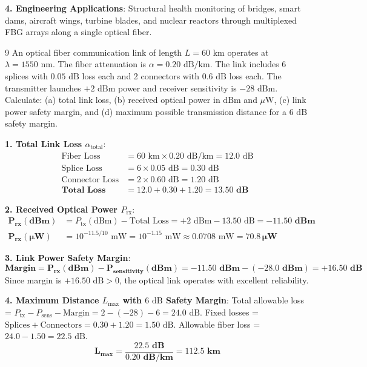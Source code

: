 \begin{theorysol}
\textbf{4. Engineering Applications}:
Structural health monitoring of bridges, smart dams, aircraft wings, turbine blades, and nuclear reactors through multiplexed FBG arrays along a single optical fiber.
\end{theorysol}
\vspace{4mm}

\begin{theoryq}{9}
An optical fiber communication link of length $L = 60\text{ km}$ operates at $\lambda = 1550\text{ nm}$. The fiber attenuation is $\alpha = 0.20\text{ dB/km}$. The link includes 6 splices with $0.05\text{ dB}$ loss each and 2 connectors with $0.6\text{ dB}$ loss each. The transmitter launches $+2\text{ dBm}$ power and receiver sensitivity is $-28\text{ dBm}$. Calculate: (a) total link loss, (b) received optical power in $\text{dBm}$ and $\mu\text{W}$, (c) link power safety margin, and (d) maximum possible transmission distance for a $6\text{ dB}$ safety margin.
\end{theoryq}
\begin{theorysol}
\textbf{1. Total Link Loss $\alpha_{\text{total}}$}:
\begin{align*}
\text{Fiber Loss} &= 60\text{ km} \times 0.20\text{ dB/km} = 12.0\text{ dB} \\
\text{Splice Loss} &= 6 \times 0.05\text{ dB} = 0.30\text{ dB} \\
\text{Connector Loss} &= 2 \times 0.60\text{ dB} = 1.20\text{ dB} \\
\mathbf{\text{Total Loss}} &= 12.0 + 0.30 + 1.20 = \mathbf{13.50\text{ dB}}
\end{align*}

\textbf{2. Received Optical Power $P_{\text{rx}}$}:
\begin{align*}
\mathbf{P_{\text{rx}}(\text{dBm})} &= P_{\text{tx}}(\text{dBm}) - \text{Total Loss} = +2\text{ dBm} - 13.50\text{ dB} = \mathbf{-11.50\text{ dBm}} \\
\mathbf{P_{\text{rx}}(\mu\text{W})} &= 10^{-11.5/10}\text{ mW} = 10^{-1.15}\text{ mW} \approx 0.0708\text{ mW} = \mathbf{70.8\,\mu\text{W}}
\end{align*}

\textbf{3. Link Power Safety Margin}:
\begin{equation}
\mathbf{\text{Margin} = P_{\text{rx}}(\text{dBm}) - P_{\text{sensitivity}}(\text{dBm}) = -11.50\text{ dBm} - (-28.0\text{ dBm}) = +16.50\text{ dB}}
\end{equation}
Since margin is $+16.50\text{ dB} > 0$, the optical link operates with excellent reliability.

\textbf{4. Maximum Distance $L_{\text{max}}$ with $6\text{ dB}$ Safety Margin}:
Total allowable loss = $P_{\text{tx}} - P_{\text{sens}} - \text{Margin} = 2 - (-28) - 6 = 24.0\text{ dB}$.
Fixed losses = $\text{Splices} + \text{Connectors} = 0.30 + 1.20 = 1.50\text{ dB}$.
Allowable fiber loss = $24.0 - 1.50 = 22.5\text{ dB}$.
\begin{equation}
\mathbf{L_{\text{max}} = \frac{22.5\text{ dB}}{0.20\text{ dB/km}} = 112.5\text{ km}}
\end{equation}
\end{theorysol}
\vspace{4mm}

